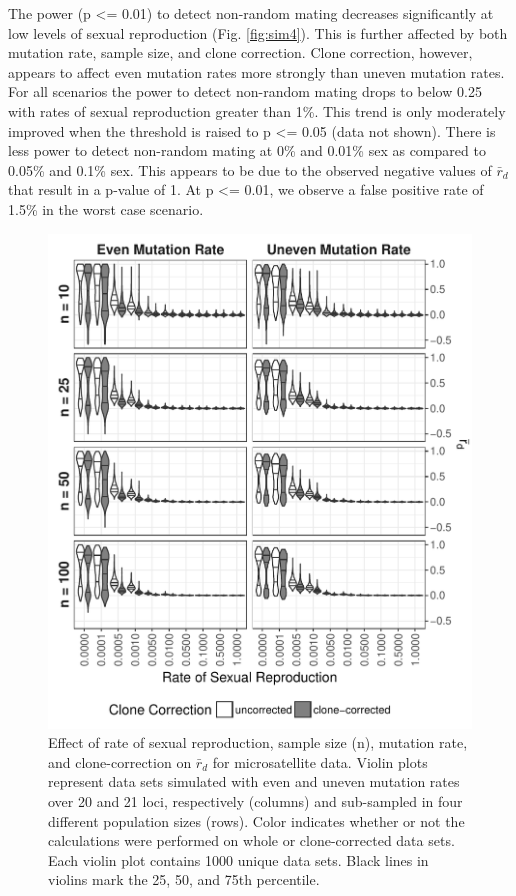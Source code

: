 \documentclass[double,11pt]{beavtex}
\begin{document}
  The power (p \textless{}= 0.01) to detect non-random mating decreases
  significantly at low levels of sexual reproduction (Fig.
  \ref{fig:sim4}). This is further affected by both mutation rate, sample
  size, and clone correction. Clone correction, however, appears to affect
  even mutation rates more strongly than uneven mutation rates. For all
  scenarios the power to detect non-random mating drops to below 0.25 with
  rates of sexual reproduction greater than 1\%. This trend is only
  moderately improved when the threshold is raised to p \textless{}= 0.05
  (data not shown). There is less power to detect non-random mating at 0\%
  and 0.01\% sex as compared to 0.05\% and 0.1\% sex. This appears to be
  due to the observed negative values of \(\bar{r}_d\) that result in a
  p-value of 1. At p \textless{}= 0.01, we observe a false positive rate
  of 1.5\% in the worst case scenario.
  
  \begin{figure}
  
  {\centering \includegraphics[width=0.8\linewidth]{figure/simulations/rd_sexrate} 
  
  }
  
  \caption[Effect of rate of sexual reproduction, sample size, mutation rate, and
  clone-correction on \(\bar{r}_d\) for microsatellite data.]{Effect of rate of sexual reproduction, sample size (n), mutation rate,
  and clone-correction on \(\bar{r}_d\) for microsatellite data. Violin
  plots represent data sets simulated with even and uneven mutation rates
  over 20 and 21 loci, respectively (columns) and sub-sampled in four
  different population sizes (rows). Color indicates whether or not the
  calculations were performed on whole or clone-corrected data sets. Each
  violin plot contains 1000 unique data sets. Black lines in violins mark
  the 25, 50, and 75th percentile.}\label{fig:sim1}
  \end{figure}
  
\end{document}
